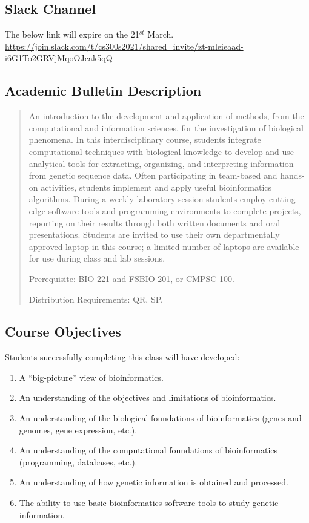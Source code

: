 \documentclass[11pt]{article} %
\begin{document}
\subsection*{\textbf{Slack Channel}}
The below link will expire on the 21$^{st}$ March.\\
{\footnotesize
\url{https://join.slack.com/t/cs300s2021/shared_invite/zt-mleieaad-i6G1To2GRVjMqoOJcak5qQ} }



\subsection*{\textbf{Academic Bulletin Description}}

\begin{quote}

An introduction to the development and application of methods, from the computational and information sciences, for the investigation of biological phenomena. In this interdisciplinary course, students integrate computational techniques with biological knowledge to develop and use analytical tools for extracting, organizing, and interpreting information from genetic sequence data. Often participating in team-based and hands-on activities, students implement and apply useful bioinformatics algorithms. During a weekly laboratory session students employ cutting-edge software tools and programming environments to complete projects, reporting on their results through both written documents and oral presentations. Students are invited to use their own departmentally approved laptop in this course; a limited number of laptops are available for use during class and lab sessions.

Prerequisite: BIO 221 and FSBIO 201, or CMPSC 100.

Distribution Requirements: QR, SP.
\end{quote}




\subsection*{\textbf{Course Objectives}}

Students successfully completing this class will have developed:
\begin{enumerate}
  \item A “big-picture” view of bioinformatics.
  \item An understanding of the objectives and limitations of bioinformatics.
  \item An understanding of the biological foundations of bioinformatics (genes and genomes, gene expression, etc.).
  \item An understanding of the computational foundations of bioinformatics (programming, databases, etc.).
  \item An understanding of how genetic information is obtained and processed.
  \item The ability to use basic bioinformatics software tools to study genetic information.
\end{enumerate}
\end{document}
